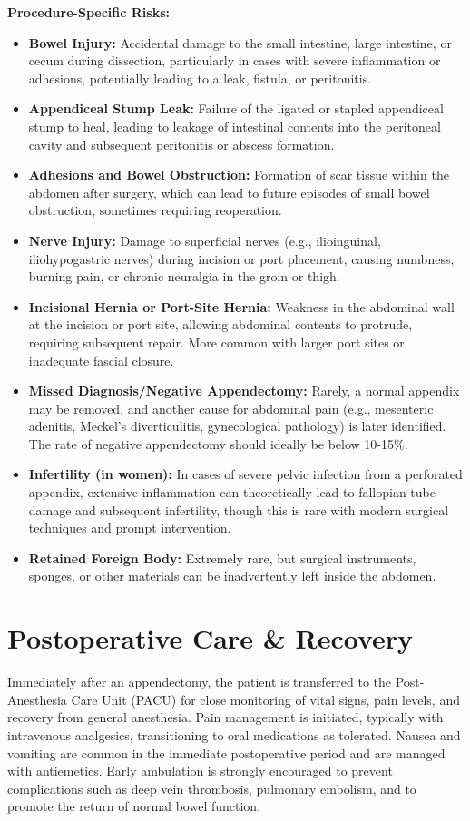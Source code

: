 \textbf{Procedure-Specific Risks:}
\begin{itemize}
  \item \textbf{Bowel Injury:} Accidental damage to the small intestine, large intestine, or cecum during dissection, particularly in cases with severe inflammation or adhesions, potentially leading to a leak, fistula, or peritonitis.
  \item \textbf{Appendiceal Stump Leak:} Failure of the ligated or stapled appendiceal stump to heal, leading to leakage of intestinal contents into the peritoneal cavity and subsequent peritonitis or abscess formation.
  \item \textbf{Adhesions and Bowel Obstruction:} Formation of scar tissue within the abdomen after surgery, which can lead to future episodes of small bowel obstruction, sometimes requiring reoperation.
  \item \textbf{Nerve Injury:} Damage to superficial nerves (e.g., ilioinguinal, iliohypogastric nerves) during incision or port placement, causing numbness, burning pain, or chronic neuralgia in the groin or thigh.
  \item \textbf{Incisional Hernia or Port-Site Hernia:} Weakness in the abdominal wall at the incision or port site, allowing abdominal contents to protrude, requiring subsequent repair. More common with larger port sites or inadequate fascial closure.
  \item \textbf{Missed Diagnosis/Negative Appendectomy:} Rarely, a normal appendix may be removed, and another cause for abdominal pain (e.g., mesenteric adenitis, Meckel's diverticulitis, gynecological pathology) is later identified. The rate of negative appendectomy should ideally be below 10-15\%.
  \item \textbf{Infertility (in women):} In cases of severe pelvic infection from a perforated appendix, extensive inflammation can theoretically lead to fallopian tube damage and subsequent infertility, though this is rare with modern surgical techniques and prompt intervention.
  \item \textbf{Retained Foreign Body:} Extremely rare, but surgical instruments, sponges, or other materials can be inadvertently left inside the abdomen.
\end{itemize}

\section*{Postoperative Care \& Recovery}
Immediately after an appendectomy, the patient is transferred to the Post-Anesthesia Care Unit (PACU) for close monitoring of vital signs, pain levels, and recovery from general anesthesia. Pain management is initiated, typically with intravenous analgesics, transitioning to oral medications as tolerated. Nausea and vomiting are common in the immediate postoperative period and are managed with antiemetics. Early ambulation is strongly encouraged to prevent complications such as deep vein thrombosis, pulmonary embolism, and to promote the return of normal bowel function.

